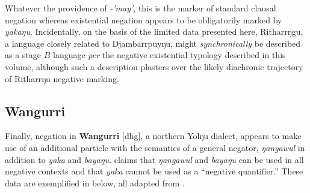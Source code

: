 \documentclass[output=paper,draft,draftmode,colorlinks,citecolor=brown]{langscibook}
\begin{document}
Whatever the providence of \textit{-'may'}, this is the marker of standard
    clausal negation whereas existential negation appears to be
    obligatorily marked by \textit{yakaŋu}. Incidentally, on the basis of
    the limited data presented here, Ritharrŋgu, a language closely related
    to Djambarrpuyŋu, might \textit{synchronically} be
    described as a stage $B$ language \textit{per} the negative existential
    typology described in this volume, although such a description plasters
    over the likely diachronic trajectory of Ritharrŋu negative
    marking.

\subsection{Wangurri}\label{sec:austr-4.3}

Finally, negation in \textbf{Wangurri} [dhg], a northern
Yolŋu dialect, appears to make use of an additional particle with the
semantics of a general negator, \textit{ŋangawul} in addition to
\textit{yaka} and \textit{bayaŋu}. \citet[195]{McLellan1992} claims that
\textit{ŋangawul} and \textit{bayaŋu} can be used in all negative contexts
and that \textit{yaka} cannot be used as a ``negative quantifier.'' These
data are exemplified in  below, all adapted from \citet{McLellan1992}.
\end{document}
